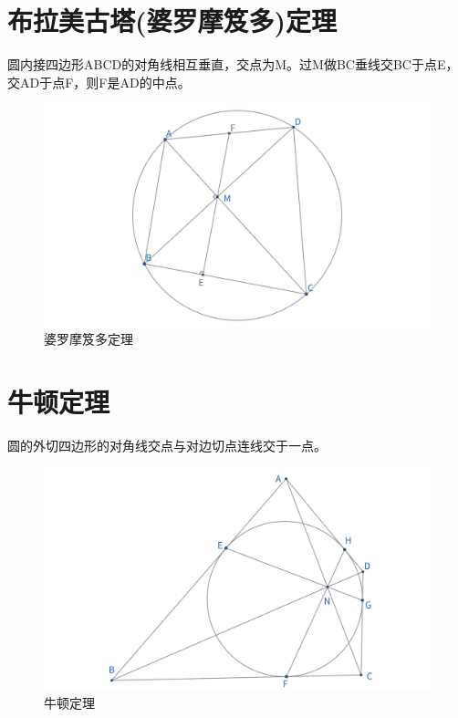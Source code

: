 \newpage
\section{布拉美古塔(婆罗摩笈多)定理}
\begin{theorem}
圆内接四边形ABCD的对角线相互垂直，交点为M。过M做BC垂线交BC于点E，交AD于点F，则F是AD的中点。
\end{theorem}
\begin{figure}[H]
    \centering
    \includegraphics[width=\linewidth]{figures/婆罗摩笈多.png}
    \caption{婆罗摩笈多定理}
\end{figure}



\newpage
\section{牛顿定理}
\begin{theorem}[牛顿(Newton)定理]
圆的外切四边形的对角线交点与对边切点连线交于一点。
\end{theorem}
\begin{figure}[H]
    \centering
    \includegraphics[width=\linewidth]{figures/牛顿定理.png}
    \caption{牛顿定理}
\end{figure}




